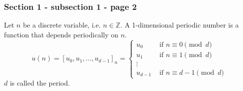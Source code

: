 \documentclass{beamer}
\newcommand{\field}[1]{\mathbb{#1}}
\newcommand{\Zset}{\field{Z}}
\begin{document}

\begin{frame}\frametitle{\textbf{\LARGE{\textrm{Section 1 - subsection 1 - page 2}}}}
    \begin{definition}
        Let $n$ be a discrete variable, i.e. $n\in\Zset$.
        A 1-dimensional periodic number is a function that depends periodically on $n$.
        $$
        u(n)=
        [u_0,u_1,\ldots,u_{d-1}]_n=
        \begin{cases}
            u_0 & \mbox{ if $n\equiv 0 \pmod d$} \\
            u_1 & \mbox{ if $n\equiv 1 \pmod d$} \\
            \vdots \\
            u_{d-1} & \mbox{ if $n\equiv d-1 \pmod d$}
        \end{cases}
        $$
        $d$ is called the period.
    \end{definition}
\end{frame}

\end{document}
